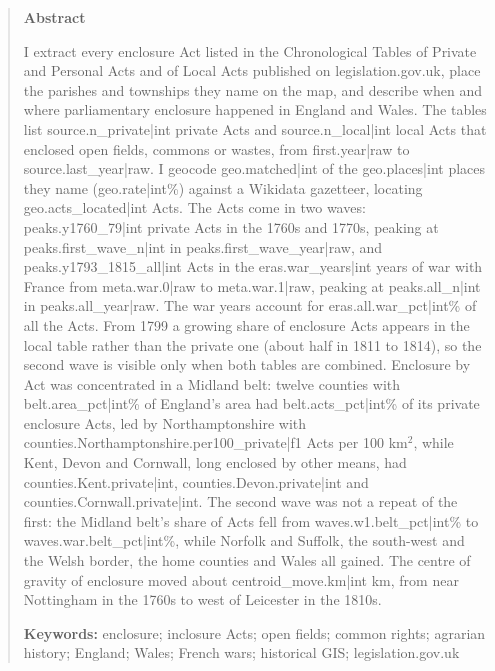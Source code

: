 \documentclass[11pt,a4paper]{article}
\begin{document}
\begin{quote}
\small
\begin{center}\textbf{Abstract}\end{center}
I extract every enclosure Act listed in the Chronological Tables of Private and Personal Acts and of Local Acts published on legislation.gov.uk, place the parishes and townships they name on the map, and describe when and where parliamentary enclosure happened in England and Wales. The tables list {{source.n_private|int}} private Acts and {{source.n_local|int}} local Acts that enclosed open fields, commons or wastes, from {{first.year|raw}} to {{source.last_year|raw}}. I geocode {{geo.matched|int}} of the {{geo.places|int}} places they name ({{geo.rate|int}}\%) against a Wikidata gazetteer, locating {{geo.acts_located|int}} Acts. The Acts come in two waves: {{peaks.y1760_79|int}} private Acts in the 1760s and 1770s, peaking at {{peaks.first_wave_n|int}} in {{peaks.first_wave_year|raw}}, and {{peaks.y1793_1815_all|int}} Acts in the {{eras.war_years|int}} years of war with France from {{meta.war.0|raw}} to {{meta.war.1|raw}}, peaking at {{peaks.all_n|int}} in {{peaks.all_year|raw}}. The war years account for {{eras.all.war_pct|int}}\% of all the Acts. From 1799 a growing share of enclosure Acts appears in the local table rather than the private one (about half in 1811 to 1814), so the second wave is visible only when both tables are combined. Enclosure by Act was concentrated in a Midland belt: twelve counties with {{belt.area_pct|int}}\% of England's area had {{belt.acts_pct|int}}\% of its private enclosure Acts, led by Northamptonshire with {{counties.Northamptonshire.per100_private|f1}} Acts per 100 km$^2$, while Kent, Devon and Cornwall, long enclosed by other means, had {{counties.Kent.private|int}}, {{counties.Devon.private|int}} and {{counties.Cornwall.private|int}}. The second wave was not a repeat of the first: the Midland belt's share of Acts fell from {{waves.w1.belt_pct|int}}\% to {{waves.war.belt_pct|int}}\%, while Norfolk and Suffolk, the south-west and the Welsh border, the home counties and Wales all gained. The centre of gravity of enclosure moved about {{centroid_move.km|int}} km, from near Nottingham in the 1760s to west of Leicester in the 1810s.

\textbf{Keywords:} enclosure; inclosure Acts; open fields; common rights; agrarian history; England; Wales; French wars; historical GIS; legislation.gov.uk
\end{quote}
\end{document}
